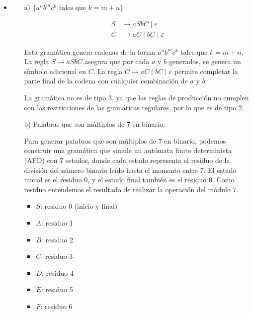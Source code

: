 \documentclass[12pt]{book} %
\begin{document}
\begin{ejercicio}
\begin{itemize}
\begin{itemize}
\begin{solucion}[media.d]
        \end{solucion}


    \end{itemize}

    \item {}
    \begin{itemize}
        \item[a)] $\{a^n b^m c^k \text{ tales que } k = m + n\}$


        \begin{solucion}[difícil.a]

        \begin{align*}
        S &\rightarrow aSbC \mid \varepsilon \\
        C &\rightarrow aC \mid bC \mid \varepsilon
        \end{align*}

        Esta gramática genera cadenas de la forma $a^n b^m c^k$ tales que $k = m + n$. La regla $S \rightarrow aSbC$ asegura que por cada $a$ y $b$ generados, se genera un símbolo adicional en $C$. La regla $C \rightarrow aC \mid bC \mid \varepsilon$ permite completar la parte final de la cadena con cualquier combinación de $a$ y $b$.

        La gramática no es de tipo 3, ya que las reglas de producción no cumplen con las restricciones de las gramáticas regulares, por lo que es de tipo 2.

        \end{solucion}



        \item[b)] Palabras que son múltiplos de 7 en binario.


        \begin{solucion}[difícil.b]

        Para generar palabras que son múltiplos de 7 en binario, podemos construir una gramática que simule un autómata finito determinista (AFD) con 7 estados, donde cada estado representa el residuo de la división del número binario leído hasta el momento entre 7. El estado inicial es el residuo 0, y el estado final también es el residuo 0. Como residuo entendemos el resultado de realizar la operación del módulo 7.

        \begin{itemize}
            \item $S$: residuo 0 (inicio y final)
            \item $A$: residuo 1
            \item $B$: residuo 2
            \item $C$: residuo 3
            \item $D$: residuo 4
            \item $E$: residuo 5
            \item $F$: residuo 6
        \end{itemize}


\end{solucion}
\end{itemize}
\end{itemize}
\end{ejercicio}
\end{document}
